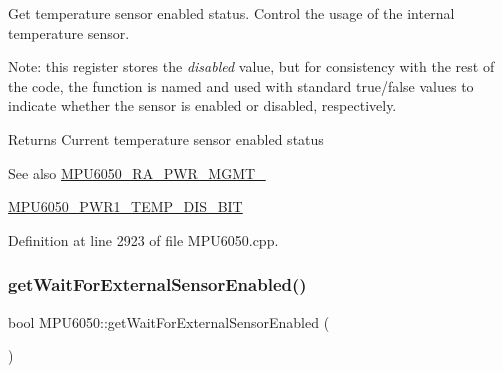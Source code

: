 Get temperature sensor enabled status. Control the usage of the internal temperature sensor.

Note\+: this register stores the {\itshape disabled} value, but for consistency with the rest of the code, the function is named and used with standard true/false values to indicate whether the sensor is enabled or disabled, respectively.

\begin{DoxyReturn}{Returns}
Current temperature sensor enabled status 
\end{DoxyReturn}
\begin{DoxySeeAlso}{See also}
\mbox{\hyperlink{MPU6050_8h_ac6c83146165a2307ac7155d4fa566df4}{M\+P\+U6050\+\_\+\+R\+A\+\_\+\+P\+W\+R\+\_\+\+M\+G\+M\+T\+\_}} 

\mbox{\hyperlink{MPU6050_8h_af87944da0c9b3b0a14ed2f0049fe0ec2}{M\+P\+U6050\+\_\+\+P\+W\+R1\+\_\+\+T\+E\+M\+P\+\_\+\+D\+I\+S\+\_\+\+B\+IT}} 
\end{DoxySeeAlso}


Definition at line 2923 of file M\+P\+U6050.\+cpp.


\begin{DoxyCode}{0}

\end{DoxyCode}
\mbox{\label{classMPU6050_a4e2ebda47b85b4c5463f041c790bf5c0}} 
\subsubsection{\texorpdfstring{getWaitForExternalSensorEnabled()}{getWaitForExternalSensorEnabled()}}
{\footnotesize\ttfamily bool M\+P\+U6050\+::get\+Wait\+For\+External\+Sensor\+Enabled (\begin{DoxyParamCaption}{ }\end{DoxyParamCaption})}

